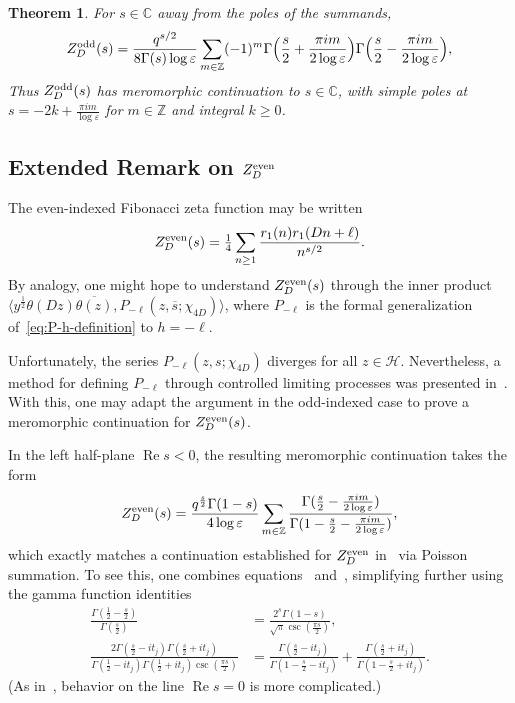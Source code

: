 \documentclass[11pt,reqno,oneside]{amsart}
\theoremstyle{plain}
\newtheorem{theorem}{Theorem}%
\theoremstyle{definition}
\renewcommand{\Re}{\operatorname{Re}}
\newcommand{\Zeven}{Z_D^{\textup{even}}}
\newcommand{\Zodd}{Z_D^{\textup{odd}}}
\newcommand{\chid}{\chi_{4D}}
\begin{document}
\begin{theorem}
  For $s \in \mathbb{C}$ away from the poles of the summands,
  \[
    \Zodd(s) = \frac{q^{s/2}}{8 \Gamma(s) \log \varepsilon}
    \sum_{m \in \mathbb{Z}} (-1)^m
    \Gamma\Big(\frac{s}{2} + \frac{\pi i m}{2\log \varepsilon}\Big)
    \Gamma\Big(\frac{s}{2} - \frac{\pi i m}{2\log \varepsilon}\Big),
  \]
  Thus $\Zodd(s)$ has meromorphic continuation to $s \in \mathbb{C}$, with simple poles at $s = - 2k + \frac{\pi i m}{\log \varepsilon}$
  for $m \in \mathbb{Z}$ and integral $k \geq 0$.
\end{theorem}

\subsection{Extended Remark on $\Zeven$}\label{rem:Z-even}
  The even-indexed Fibonacci zeta function may be written
  \[
    \Zeven(s) = \tfrac{1}{4} \sum_{n \geq 1} \frac{r_1(n) r_1(Dn+\ell)}{n^{s/2}}.
  \]
  By analogy, one might hope to understand $\Zeven(s)$ through the inner product
  $\langle y^{\frac{1}{2}} \theta(Dz) \overline{\theta(z)}, P_{-\ell}(z,
    \overline{s}; \chid) \rangle$, where $P_{-\ell}$ is the formal generalization
  of~\eqref{eq:P-h-definition} to $h=-\ell$.

  Unfortunately, the series $P_{-\ell}(z,s;\chid)$ diverges for all $z \in
    \mathcal{H}$. Nevertheless, a method for defining $P_{-\ell}$ through controlled
  limiting processes was presented in~\cite{hoffsteinhulse13}. With this, one may
  adapt the argument in the odd-indexed case to prove a meromorphic continuation
  for $\Zeven(s)$.

  In the left half-plane $\Re s < 0$, the resulting meromorphic continuation takes the form
  \[
    \Zeven(s) = \frac{q^{\frac{s}{2}} \Gamma(1-s)}{4 \log \varepsilon}
    \sum_{m \in \mathbb{Z}} \frac{\Gamma(\frac{s}{2} - \frac{\pi i m}{2 \log \varepsilon})}{\Gamma(1-\frac{s}{2} - \frac{\pi i m}{2 \log \varepsilon})},
  \]
  which exactly matches a continuation established for $\Zeven$ in~\cite{akldwFibonacciGeneral} via Poisson summation. To see this, one combines equations~\cite[(3.29)]{hoffsteinhulse13} and~\cite[(4.17)]{hoffsteinhulse13}, simplifying further using the gamma function identities
  \begin{align*}
    \frac{\Gamma(\frac{1}{2}- \frac{s}{2})}{\Gamma(\frac{s}{2})}
     & = \frac{2^s \Gamma(1-s)}{\sqrt{\pi} \csc(\frac{\pi s}{2})},       \\
    \frac{2 \Gamma(\frac{s}{2} - it_j)\Gamma(\frac{s}{2} + it_j)}{\Gamma(\frac{1}{2} - it_j) \Gamma(\frac{1}{2} + it_j) \csc(\frac{\pi s}{2})}
     & = \frac{\Gamma(\frac{s}{2} - it_j)}{\Gamma(1-\frac{s}{2} - it_j)}
    + \frac{\Gamma(\frac{s}{2} + it_j)}{\Gamma(1-\frac{s}{2} + it_j)}.
  \end{align*}
  (As in~\cite[\S{4.2}]{akldwFibonacciGeneral}, behavior on the line $\Re s = 0$ is more complicated.)



\end{document}
